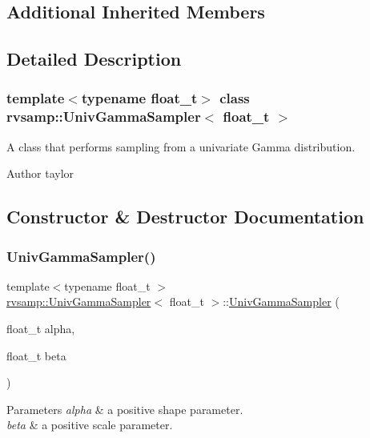 \subsection*{Additional Inherited Members}


\subsection{Detailed Description}
\subsubsection*{template$<$typename float\+\_\+t$>$\newline
class rvsamp\+::\+Univ\+Gamma\+Sampler$<$ float\+\_\+t $>$}

A class that performs sampling from a univariate Gamma distribution. 

\begin{DoxyAuthor}{Author}
taylor 
\end{DoxyAuthor}


\subsection{Constructor \& Destructor Documentation}
\mbox{\label{classrvsamp_1_1UnivGammaSampler_a5d3f04ff5b9df2418a22b30d286cfecd}} 
\subsubsection{\texorpdfstring{Univ\+Gamma\+Sampler()}{UnivGammaSampler()}}
{\footnotesize\ttfamily template$<$typename float\+\_\+t $>$ \\
\hyperlink{classrvsamp_1_1UnivGammaSampler}{rvsamp\+::\+Univ\+Gamma\+Sampler}$<$ float\+\_\+t $>$\+::\hyperlink{classrvsamp_1_1UnivGammaSampler}{Univ\+Gamma\+Sampler} (\begin{DoxyParamCaption}\item[{float\+\_\+t}]{alpha,  }\item[{float\+\_\+t}]{beta }\end{DoxyParamCaption})}


\begin{DoxyParams}{Parameters}
{\em alpha} & a positive shape parameter. \\
\hline
{\em beta} & a positive scale parameter. \\
\hline
\end{DoxyParams}


